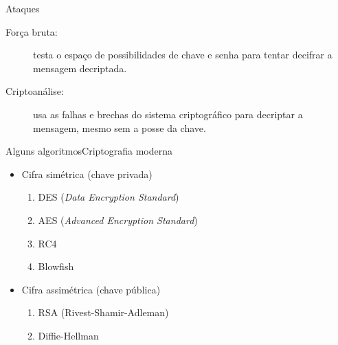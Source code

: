 \begin{frame}{Ataques}

\begin{description}

\item[For\c{c}a bruta:] testa o espa\c{c}o de possibilidades de chave e senha para tentar 
decifrar a mensagem decriptada.

\item[Criptoan\'{a}lise:] usa as falhas e brechas do sistema criptogr\'{a}fico para decriptar 
a mensagem, mesmo sem a posse da chave.
\end{description}
\end{frame}

\begin{frame}{Alguns algoritmos}{Criptografia moderna}

  \begin{itemize}[<+-| alert@+>]
  \item Cifra simétrica (chave privada)
    \begin{enumerate}
    \item DES ({\it Data Encryption Standard})
    \item AES ({\it Advanced Encryption Standard})
    \item RC4
    \item Blowfish
    \end{enumerate}

  \item Cifra assimétrica (chave pública)
    \begin{enumerate}
    \item RSA (Rivest-Shamir-Adleman)
    \item Diffie-Hellman
    \end{enumerate}

  \end{itemize}
  
\end{frame}


\frame{\title{\insertlecture}\maketitle}

